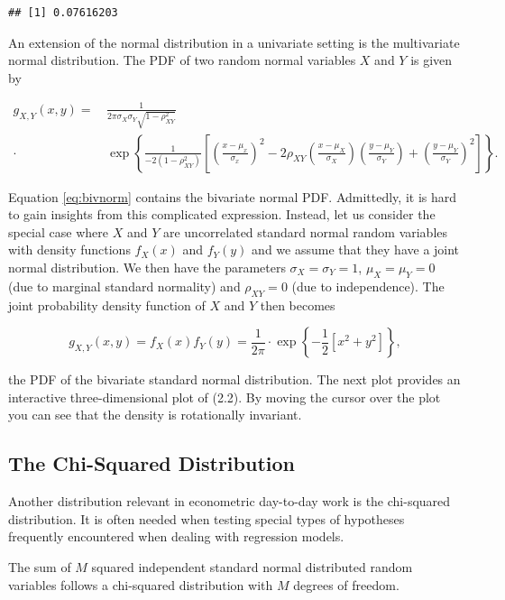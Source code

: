 \documentclass[]{book}
\theoremstyle{definition}
\theoremstyle{definition}
\theoremstyle{definition}
\theoremstyle{remark}
\begin{document}
\begin{verbatim}
## [1] 0.07616203
\end{verbatim}

An extension of the normal distribution in a univariate setting is the
multivariate normal distribution. The PDF of two random normal variables
\(X\) and \(Y\) is given by

\begin{align}
g_{X,Y}(x,y) =& \, \frac{1}{2\pi\sigma_X\sigma_Y\sqrt{1-\rho_{XY}^2}} \\ 
\cdot & \, \exp \left\{ \frac{1}{-2(1-\rho_{XY}^2)} \left[ \left( \frac{x-\mu_x}{\sigma_x} \right)^2 - 2\rho_{XY}\left( \frac{x-\mu_X}{\sigma_X} \right)\left( \frac{y-\mu_Y}{\sigma_Y} \right) + \left( \frac{y-\mu_Y}{\sigma_Y} \right)^2 \right]  \right\}. \label{eq:bivnorm}
\end{align}

Equation \eqref{eq:bivnorm} contains the bivariate normal PDF. Admittedly,
it is hard to gain insights from this complicated expression. Instead,
let us consider the special case where \(X\) and \(Y\) are uncorrelated
standard normal random variables with density functions \(f_X(x)\) and
\(f_Y(y)\) and we assume that they have a joint normal distribution. We
then have the parameters \(\sigma_X = \sigma_Y = 1\), \(\mu_X=\mu_Y=0\)
(due to marginal standard normality) and \(\rho_{XY}=0\) (due to
independence). The joint probability density function of \(X\) and \(Y\)
then becomes

\[ g_{X,Y}(x,y) = f_X(x) f_Y(y) = \frac{1}{2\pi} \cdot \exp \left\{ -\frac{1}{2} \left[x^2 + y^2 \right]  \right\}, \tag{2.2}  \]

the PDF of the bivariate standard normal distribution. The next plot
provides an interactive three-dimensional plot of (2.2). By moving the
cursor over the plot you can see that the density is rotationally
invariant.

\subsection*{The Chi-Squared
Distribution}\label{the-chi-squared-distribution}

Another distribution relevant in econometric day-to-day work is the
chi-squared distribution. It is often needed when testing special types
of hypotheses frequently encountered when dealing with regression
models.

The sum of \(M\) squared independent standard normal distributed random
variables follows a chi-squared distribution with \(M\) degrees of
freedom.
\end{document}
